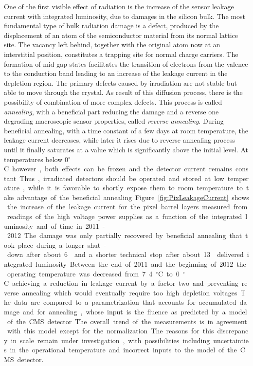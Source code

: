 One of the first visible effect of radiation is the increase of the sensor leakage current with integrated luminosity, due to damages in the silicon bulk.
The most fundamental type of bulk radiation damage is a defect, produced by the displacement of an atom of the semiconductor material from its normal lattice site.
The vacancy left behind, together with the original atom now at an interstitial position, constitutes a trapping site for normal charge carriers.
The formation of mid-gap states facilitates the transition of electrons from the valence to the conduction band leading to an increase of the leakage current in the depletion region.
The primary defects caused by irradiation are not stable but able to move through the crystal. As result of this diffusion process, there is the possibility of combination of more complex defects.
This process is called \textit{annealing}, with a beneficial part reducing the damage and a reverse one degrading macroscopic sensor properties, called \textit{reverse annealing}.
During beneficial annealing, with a time constant of a few days at room temperature, the leakage current decreases, while later it rises due to reverse annealing process until it finally saturates at a value which is significantly above the initial level. At temperatures below 0\unit{$^\circ$C} however, both effects can be frozen and the detector current remains constant.
Thus, irradiated detectors should be operated and stored at low temperature, while it is favorable to shortly expose them to room temperature to take advantage of the beneficial annealing.

Figure~\ref{fig:PixLeakageCurrent} shows the increase of the leakage current for the pixel barrel layers measured from readings of the high voltage power supplies as a function of the integrated luminosity and of time in 2011-2012.
The damage was only partially recovered by beneficial annealing that took place during a longer shut-down after about 6\fbinv and a shorter technical stop after about 13\fbinv delivered integrated luminosity.
Between the end of 2011 and the beginning of 2012 the operating temperature was decreased from 7.4\unit{$^\circ$C} to 0\unit{$^\circ$C} achieving a reduction in leakage current by a factor two and preventing reverse annealing which would eventually require too high depletion voltages.
The data are compared to a parametrization that accounts for accumulated damage and for annealing, whose input is the fluence as predicted by a model of the CMS detector.
The overall trend of the measurements is in agreement with this model except for the normalization.
The reasons for this discrepancy in scale remain under investigation, with possibilities including uncertainties in the operational temperature and incorrect inputs to the model of the CMS detector.

